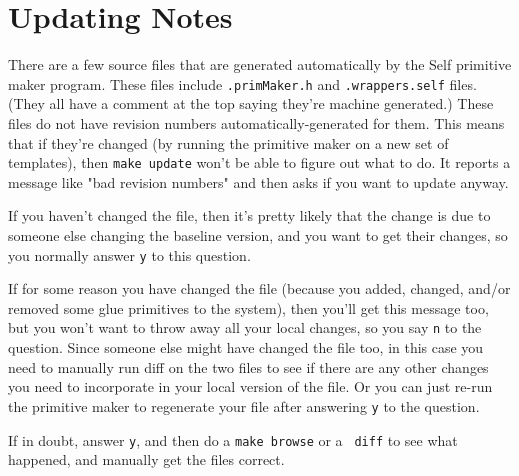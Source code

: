 \section{Updating Notes}
There are a few source files that are generated automatically by the
Self primitive maker program.  These files include {\tt *.primMaker.h}
and {\tt *.wrappers.self} files.  (They all have a comment at the top
saying they're machine generated.)  These files do not have revision
numbers automatically-generated for them.  This means that if they're
changed (by running the primitive maker on a new set of templates),
then {\tt make update} won't be able to figure out what to do.  It
reports a message like "bad revision numbers" and then asks if you
want to update anyway.

If you haven't changed the file, then it's pretty likely that the
change is due to someone else changing the baseline version, and you
want to get their changes, so you normally answer {\tt y} to this
question.

If for some reason you have changed the file (because you added,
changed, and/or removed some glue primitives to the system), then
you'll get this message too, but you won't want to throw away all your
local changes, so you say {\tt n} to the question.  Since someone else
might have changed the file too, in this case you need to manually run
diff on the two files to see if there are any other changes you need
to incorporate in your local version of the file.  Or you can just
re-run the primitive maker to regenerate your file after answering
{\tt y} to the question.

If in doubt, answer {\tt y}, and then do a {\tt make browse} or a {\tt
diff} to see what happened, and manually get the files correct.

